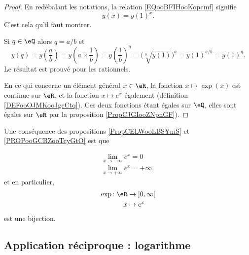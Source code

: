 \begin{proof}
    En redébalant les notations, la relation \ref{EQooBFIHooKopcmf} signifie
    \begin{equation}
        y(x)=y(1)^x.
    \end{equation}
    C'est cela qu'il faut montrer. 

    Si \( q\in \eQ\) alors \( q=a/b\) et
    \begin{equation}
        y(q)=y\left( \frac{ a }{ b } \right)=y\left( a\times \frac{1}{ b } \right)=y\left( \frac{1}{ b } \right)^a=\big( \sqrt[b]{y(1)} \big)^a=y(1)^{a/b}=y(1)^{q}.
    \end{equation}
    Le résultat est prouvé pour les rationnels.

    En ce qui concerne un élément général \( x\in \eR\), la fonction \( x\mapsto \exp(x)\) est continue sur \( \eR\), et la fonction \( x\mapsto e^x\) également (définition \ref{DEFooOJMKooJgcCtq}). Ces deux fonctions étant égales sur \( \eQ\), elles sont égales sur \( \eR\) par la proposition  \ref{PropCJGIooZNpnGF}).
\end{proof}

Une conséquence des propositions \ref{PropCELWooLBSYmS} et \ref{PROPooGCBZooTcyGtO} est que 

\begin{subequations}    \label{EqLOIUooHxnEDn}
    \begin{align}
        \lim_{x\to -\infty}  e^{x}=0\\
        \lim_{x\to +\infty}  e^{x}=+\infty,
    \end{align}
\end{subequations}
et en particulier, 
\begin{equation}
    \begin{aligned}
    \exp\colon \eR&\to \mathopen] 0 , \infty \mathclose[ \\
        x&\mapsto  e^{x} 
    \end{aligned}
\end{equation}
est une bijection.

\subsection{Application réciproque : logarithme}


